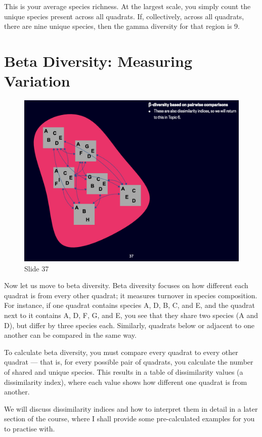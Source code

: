 \documentclass[
  10pt,
]{book}
\begin{document}
This is your average species richness. At the largest scale, you simply
count the unique species present across all quadrats. If, collectively,
across all quadrats, there are nine unique species, then the gamma
diversity for that region is \(9\).

\section{Beta Diversity: Measuring
Variation}\label{beta-diversity-measuring-variation}

\begin{figure}[ht]
\centering
\includegraphics[width=0.8\linewidth]{../images/BDC334/BDC334-037.jpeg}
\caption*{Slide 37}
\end{figure}

Now let us move to beta diversity. Beta diversity focuses on how
different each quadrat is from every other quadrat; it measures turnover
in species composition. For instance, if one quadrat contains species A,
D, B, C, and E, and the quadrat next to it contains A, D, F, G, and E,
you see that they share two species (A and D), but differ by three
species each. Similarly, quadrats below or adjacent to one another can
be compared in the same way.

To calculate beta diversity, you must compare every quadrat to every
other quadrat --- that is, for every possible pair of quadrats, you
calculate the number of shared and unique species. This results in a
table of dissimilarity values (a dissimilarity index), where each value
shows how different one quadrat is from another.

We will discuss dissimilarity indices and how to interpret them in
detail in a later section of the course, where I shall provide some
pre-calculated examples for you to practise with.
\end{document}
